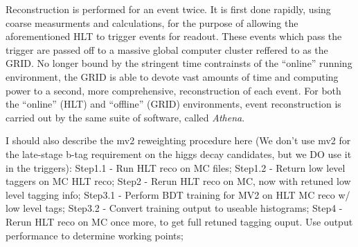         Reconstruction is performed for an event twice.
        It is first done rapidly, using coarse measurments and calculations,
            for the purpose of allowing the aforementioned HLT to trigger events for readout.
        These events which pass the trigger are passed off to a massive global computer cluster reffered to as the GRID.
        No longer bound by the stringent time contrainsts of the ``online'' running environment,
            the GRID is able to devote vast amounts of time and computing power to a second, 
            more comprehensive, reconstruction of each event.
        For both the ``online'' (HLT) and ``offline'' (GRID) environments, event reconstruction is carried out by the same suite of software,
            called \textit{Athena}.
            
        I should also describe the mv2 reweighting procedure here
            (We don't use mv2 for the late-stage b-tag requirement on the higgs decay candidates,
            but we DO use it in the triggers):
            Step1.1 - Run HLT reco on MC files;
            Step1.2 - Return low level taggers on MC HLT reco;
            Step2   - Rerun HLT reco on MC, now with retuned low level tagging info;
            Step3.1 - Perform BDT training for MV2 on HLT MC reco w/ low level tags;
            Step3.2 - Convert training output to useable histograms;
            Step4   - Rerun HLT reco on MC once more, to get full retuned tagging ouput. Use output performance to determine working points;


